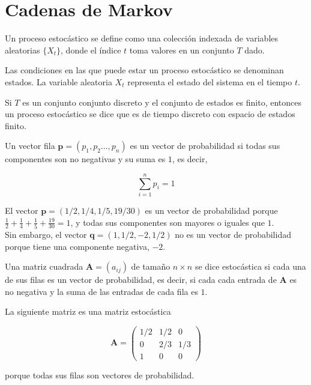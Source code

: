 \chapter{Cadenas de Markov}

\begin{defi}
Un proceso estocástico se define como una colección indexada de variables aleatorias $\{X_t\}$, donde el índice $t$ toma valores en un conjunto $T$ dado.  
\end{defi}

\begin{defi}
Las condiciones en las que puede estar un proceso estocástico se denominan estados. La variable aleatoria $X_t$ representa el estado del sistema en el tiempo $t$.
\end{defi}

\begin{defi}
Si $T$ es un conjunto conjunto discreto y el conjunto de estados es finito, entonces un proceso estocástico se dice que es de tiempo discreto con espacio de estados finito. 
\end{defi}

\begin{defi}
Un vector fila $\mathbf{p} = (p_1,p_2\dots,p_n)$ es un vector de probabilidad si todas sus componentes son no negativas y su suma es $1$, es decir,

\[ \sum\limits_{i=1}^{n} p_i = 1 \]
\end{defi}

\begin{ejemplo}
El vector $\mathbf{p} = (1/2, 1/4, 1/5, 19/30)$ es un vector de probabilidad porque $\frac{1}{2} + \frac{1}{4} + \frac{1}{5} + \frac{19}{30} = 1$, y todas sus componentes son mayores o iguales que $1$. \\
Sin embargo, el vector $\mathbf{q} = (1, 1/2, -2, 1/2)$ no es un vector de probabilidad porque tiene una componente negativa, $-2$.
\end{ejemplo}

\begin{defi}
Una matriz cuadrada $\mathbf{A} = (a_{ij})$ de tamaño $n \times n$ se dice estocástica si cada una de sus filas es un vector de probabilidad, es decir, si cada cada entrada de $\mathbf{A}$ es no negativa y la suma de las entradas de cada fila es $1$.
\end{defi}

\begin{ejemplo}
La siguiente matriz es una matriz estocástica 

\[\mathbf{A} = \left(\begin{array}{ccc}
1/2 & 1/2 & 0\\
0   & 2/3 & 1/3\\
1   &  0  & 0
\end{array}\right) \]

porque todas sus filas son vectores de probabilidad.
\end{ejemplo}

